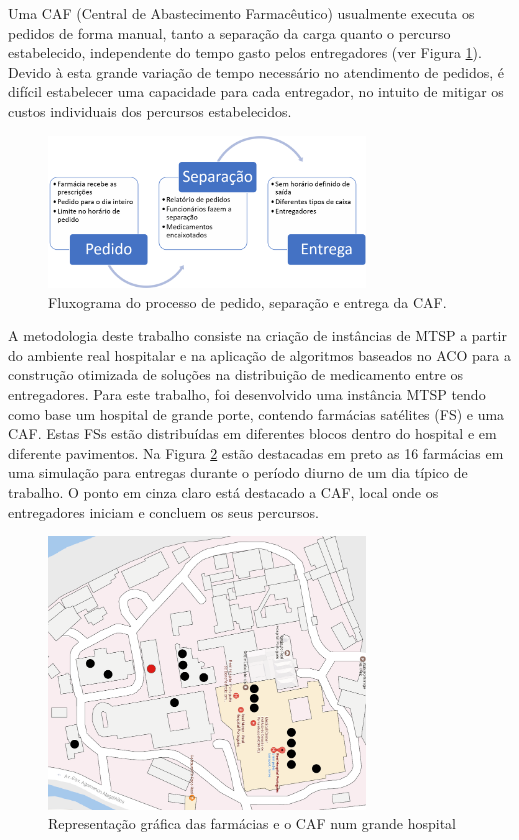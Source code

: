Uma CAF (Central de Abastecimento Farmacêutico) usualmente executa os pedidos de forma manual, tanto a separação da carga quanto o percurso estabelecido, independente do tempo gasto pelos entregadores (ver Figura \ref{fig:caf-fluxograma}). Devido à esta grande variação de tempo necessário no atendimento de pedidos, é difícil estabelecer uma capacidade para cada entregador, no intuito de mitigar os custos individuais dos percursos estabelecidos.

\begin{figure}[htb]
    \centering
    \caption{\label{fig:caf-fluxograma}Fluxograma do processo de pedido, separação e entrega da CAF.} 
    \includegraphics[width=0.75\textwidth]{imagens/fluxograma.png}
\end{figure}

A metodologia deste trabalho consiste na criação de instâncias de MTSP a partir do ambiente real hospitalar e na aplicação de algoritmos baseados no ACO para a construção otimizada de soluções na distribuição de medicamento entre os entregadores.
Para este trabalho, foi desenvolvido uma instância MTSP tendo como base um hospital de grande porte, contendo farmácias satélites (FS) e uma CAF. Estas FSs estão distribuídas em diferentes blocos dentro do hospital e em diferente pavimentos. Na Figura \ref{fig:dataset-map} estão destacadas em preto as 16 farmácias em uma simulação para entregas durante o período diurno de um dia típico de trabalho. O ponto em cinza claro está destacado a CAF, local onde os entregadores iniciam e concluem os seus percursos.

\begin{figure}[htb]
    \centering
    \caption{\label{fig:dataset-map}Representação gráfica das farmácias e o CAF num grande hospital} 
    \includegraphics[width=0.75\textwidth]{imagens/dataset-map.png}
\end{figure}

